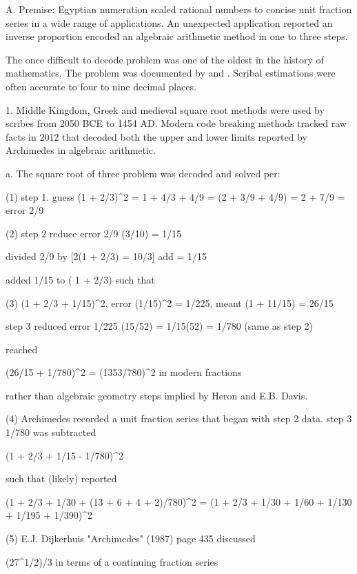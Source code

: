 \documentclass[12pt]{article}
\begin{document}
A. Premise: Egyptian numeration scaled rational numbers to concise unit fraction series in a wide range of applications.  An unexpected application reported an inverse proportion encoded an algebraic arithmetic  method in one to three steps. 

The once difficult to decode problem was one of the oldest in the history of mathematics. The problem was documented by  and . Scribal estimations were often accurate to four to nine decimal places.    

1. Middle Kingdom, Greek and medieval square root methods were used by scribes from 2050 BCE to 1454 AD. Modern code breaking methods tracked raw facts in 2012 that decoded both the upper and lower limits reported by Archimedes in algebraic arithmetic.
 
a. The square root of three problem was decoded and solved per: 

(1) step 1. guess (1 + 2/3)^2 = 1 + 4/3 + 4/9 = (2 + 3/9 + 4/9) = 2 + 7/9 = error 2/9

(2) step 2 reduce error 2/9 (3/10) = 1/15 

  divided 2/9 by [2(1 + 2/3) = 10/3]  add = 1/15

  added  1/15 to ( 1 + 2/3) such that

(3) (1 + 2/3 + 1/15)^2, error (1/15)^2 = 1/225, meant   (1 + 11/15) = 26/15

step 3 reduced error 1/225 (15/52) = 1/15(52) = 1/780 (same as step 2) 

reached 

(26/15 + 1/780)^2 = (1353/780)^2 in modern fractions

rather than algebraic geometry steps implied by Heron and E.B. Davis.

(4) Archimedes recorded a unit fraction series that began with step 2 data. 
step 3 1/780 was subtracted

(1 + 2/3 + 1/15 - 1/780)^2

such that (likely) reported

(1 + 2/3 + 1/30 + (13 + 6 + 4 + 2)/780)^2 = (1 + 2/3 + 1/30 + 1/60 + 1/130 + 1/195 + 1/390)^2

(5) E.J. Dijkerhuis "Archimedes" (1987) page 435 discussed

(27^1/2)/3 in terms of a continuing fraction series
\end{document}
